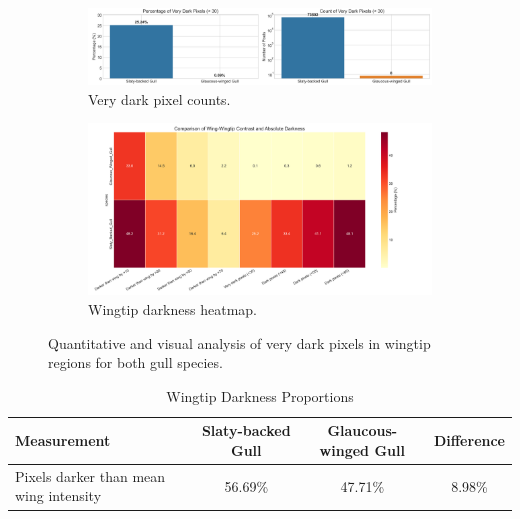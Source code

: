 \documentclass[a4paper,12pt]{report}
\begin{document}
\begin{figure}[H]
    \centering
    \begin{subfigure}[b]{0.48\textwidth}
        \centering
        \includegraphics[width=\textwidth]{images/REPORT_IMAGES_INTENSITY/I2/darkpixels.png}
        \caption{Very dark pixel counts.}
        \label{fig:dark_pixels}
    \end{subfigure}
    \hfill
    \begin{subfigure}[b]{0.48\textwidth}
        \centering
        \includegraphics[width=\textwidth]{images/REPORT_IMAGES_INTENSITY/I1/wingtip_darkness_heatmap.png}
        \caption{Wingtip darkness heatmap.}
        \label{fig:wingtip_heatmap}
    \end{subfigure}
    \caption{Quantitative and visual analysis of very dark pixels in wingtip regions for both gull species.}
    \label{fig:dark_pixel_heat_combined}
\end{figure}

\begin{table}[H]
    \centering
    \caption{Wingtip Darkness Proportions}
    \label{tab:darknessproportion}
    \begin{tabular}{lccc}
        \toprule
        Measurement & Slaty-backed Gull & Glaucous-winged Gull & Difference \\
        \midrule
        Pixels darker than mean wing intensity & 56.69\% & 47.71\% & 8.98\% \\
        \bottomrule
    \end{tabular}
\end{table}
\end{document}
